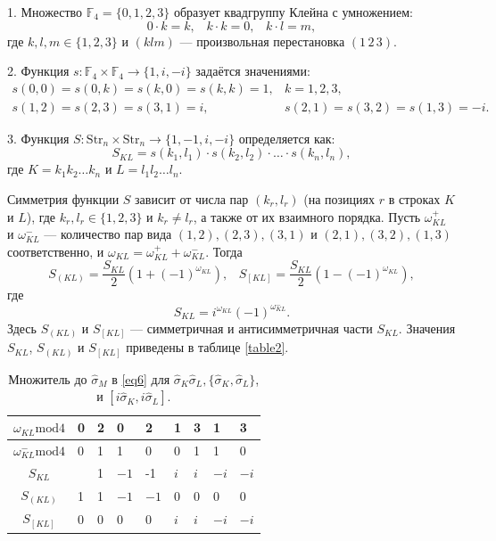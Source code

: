 \documentclass[a4paper]{report}
\begin{document}
1. Множество ${\mathbb{F}_4 = \{0,1,2,3\}}$ образует квадгруппу ${\mbox{Клейна}}$ с умножением:
$${
    0 \cdot k = k,\;\;\;
    k \cdot k = 0,\;\;\;
    k \cdot l = m,
}$$
где ${k,l,m \in \{1,2,3\}}$ и ${(klm)}$ — произвольная перестановка ${(1\,2\,3)}$.

2. Функция ${s: \mathbb{F}_4 \times \mathbb{F}_4 \to \{1, i, -i\}}$ задаётся значениями:
$${
    \begin{array}{ll}
        s(0,0) = s(0,k) = s(k,0) = s(k,k) = 1, & k=1,2,3, \\
        s(1,2) = s(2,3) = s(3,1) = i, & s(2,1) = s(3,2) = s(1,3) = -i.
    \end{array}
}$$

3. Функция ${S: \mathrm{Str}_n \times \mathrm{Str}_n \to \{1, -1, i, -i\}}$ определяется как:
$${
    S_{KL} = s(k_1, l_1) \cdot s(k_2, l_2) \cdot \ldots \cdot s(k_n, l_n),
}$$
где ${K = k_1k_2\ldots k_n}$ и ${L = l_1l_2\ldots l_n}$.

Симметрия функции ${S}$ зависит от числа пар ${(k_r, l_r)}$ (на позициях ${r}$ в строках ${K}$ и ${L}$), где ${k_r, l_r \in \{1,2,3\}}$ и ${k_r \neq l_r}$, а также от их взаимного порядка. Пусть ${\omega^+_{KL}}$ и ${\omega^-_{KL}}$ — количество пар вида ${(1,2),(2,3),(3,1)}$ и ${(2,1),(3,2),(1,3)}$ соответственно, и ${\omega_{KL} = \omega^+_{KL} + \omega^-_{KL}}$. Тогда
\begin{equation}\label{eq5}
    S_{(KL)} = \frac{S_{KL}}{2}\left(1 + (-1)^{\omega_{KL}}\right),\;\;\;
    S_{[KL]} = \frac{S_{KL}}{2}\left(1 - (-1)^{\omega_{KL}}\right),
\end{equation}
где $$S_{KL} = i^{\omega_{KL}}(-1)^{\omega^-_{KL}}.$$
Здесь ${S_{(KL)}}$ и ${S_{[KL]}}$ — симметричная и антисимметричная части ${S_{KL}}$. Значения ${S_{KL}}$, ${S_{(KL)}}$ и ${S_{[KL]}}$ приведены в таблице \ref{table2}.

\begin{table}[h!]
    \centering
    \begin{tabular}{ | c | P{1cm} | P{1cm} | P{1cm} | P{1cm} | P{1cm} | P{1cm} | P{1cm} | P{1cm} | }
        \hline
        ${\omega_{KL}\mathrm{mod4}}$     & 0 & 2 & 0      & 2      & 1     & 3     & 1      & 3      \\
        \hline
        ${\omega_{KL}^{-}\mathrm{mod4}}$ & 0 & 1 & 1      & 0      & 0     & 1     & 1      & 0      \\
        \hline\hline
        ${S_{KL}}$                       &   & 1 & ${-1}$ & -1     & ${i}$ & ${i}$ & ${-i}$ & ${-i}$ \\
        \hline
        ${S_{(KL)}}$                     & 1 & 1 & ${-1}$ & ${-1}$ & 0     & 0     & 0      & 0      \\
        \hline
        ${S_{[KL]}}$                     & 0 & 0 & 0      & 0      & ${i}$ & ${i}$ & ${-i}$ & ${-i}$ \\
        \hline
    \end{tabular}
    \caption{Множитель до ${\hat{\sigma}_M}$ в \eqref{eq6} для ${\hat{\sigma}_K\hat{\sigma}_L,\{\hat{\sigma}_K,\hat{\sigma}_L\}}$, и ${[i\hat{\sigma}_K,i\hat{\sigma}_L]}$.}\label{table1}
\end{table}
\end{document}
